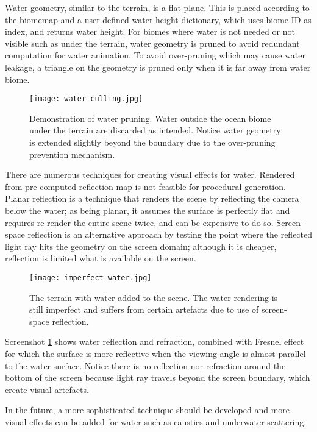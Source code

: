 \documentclass[oneside, a4paper]{report}
\begin{document}
    Water geometry, similar to the terrain, is a flat plane. This is placed according to the biomemap and a user-defined water height dictionary, which uses biome ID as index, and returns water height. For biomes where water is not needed or not visible such as under the terrain, water geometry is pruned to avoid redundant computation for water animation. To avoid over-pruning which may cause water leakage, a triangle on the geometry is pruned only when it is far away from water biome.

    \begin{figure}[H]
        \texttt{[image: water-culling.jpg]}
        \caption{Demonstration of water pruning. Water outside the ocean biome under the terrain are discarded as intended. Notice water geometry is extended slightly beyond the boundary due to the over-pruning prevention mechanism.}
    \end{figure}

    There are numerous techniques for creating visual effects for water. Rendered from pre-computed reflection map is not feasible for procedural generation. Planar reflection is a technique that renders the scene by reflecting the camera below the water; as being planar, it assumes the surface is perfectly flat and requires re-render the entire scene twice, and can be expensive to do so. Screen-space reflection is an alternative approach by testing the point where the reflected light ray hits the geometry on the screen domain; although it is cheaper, reflection is limited what is available on the screen.

    \begin{figure}[H]
        \texttt{[image: imperfect-water.jpg]}
        \caption{The terrain with water added to the scene. The water rendering is still imperfect and suffers from certain artefacts due to use of screen-space reflection.}
        \label{water-ssr}
    \end{figure}

    Screenshot \ref{water-ssr} shows water reflection and refraction, combined with Fresnel effect for which the surface is more reflective when the viewing angle is almost parallel to the water surface. Notice there is no reflection nor refraction around the bottom of the screen because light ray travels beyond the screen boundary, which create visual artefacts.

    In the future, a more sophisticated technique should be developed and more visual effects can be added for water such as caustics and underwater scattering.
\end{document}

